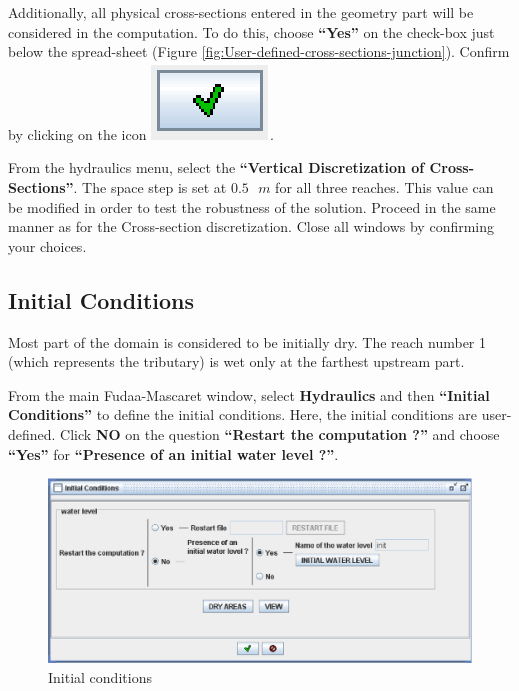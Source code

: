 \documentclass[a4paper,12pt]{article}
\begin{document}
Additionally, all physical cross-sections entered in the geometry
part will be considered in the computation. To do this, choose \textbf{{}``Yes''}
on the check-box just below the spread-sheet (Figure \ref{fig:User-defined-cross-sections-junction}).
Confirm by clicking on the icon \includegraphics[scale=0.6]{valid}.

\vspace{0.5cm}

From the hydraulics menu, select the \textbf{{}``Vertical
Discretization of Cross-Sections''}. The space step is set at $0.5\mbox{ }m$ for all three reaches. This value can be modified in order to test the robustness of the solution. Proceed in the same manner as for the Cross-section
discretization. Close all windows by confirming your choices.


\subsection{Initial Conditions}

\hspace{0.5cm}Most part of the domain is considered to be initially dry. The reach
number 1 (which represents the tributary) is wet only at the farthest upstream part.

\vspace{0.5cm}

From the main Fudaa-Mascaret window, select \textbf{ Hydraulics} and then \textbf{{}``Initial Conditions''} to define the initial conditions.
Here, the initial conditions are user-defined. Click \textbf{NO
} on the question \textbf{{}``Restart the computation ?''} and 
choose \textbf{{}``Yes''} for \textbf{{}``Presence of an initial
water level ?''}. 

\begin{figure}[h]
  \begin{center}
  \includegraphics[scale=0.5]{initial-cond}
  \caption{Initial conditions}
  \end{center}
\end{figure}
\end{document}

